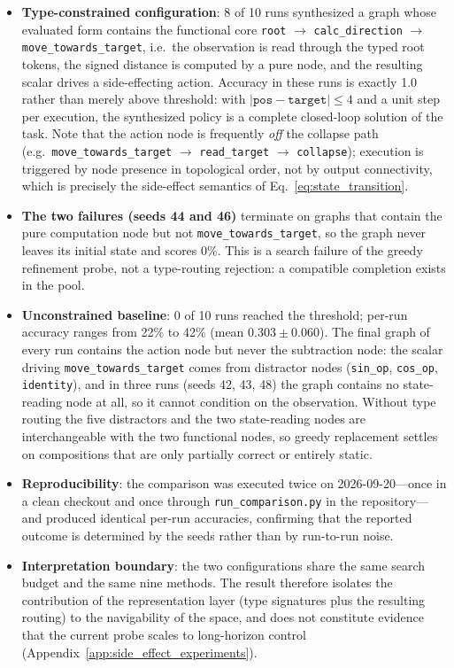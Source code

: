 \begin{itemize}
    \item \textbf{Type-constrained configuration}: 8 of 10 runs synthesized a graph whose evaluated form contains the functional core \texttt{root} $\rightarrow$ \texttt{calc\_direction} $\rightarrow$ \texttt{move\_towards\_target}, i.e.\ the observation is read through the typed root tokens, the signed distance is computed by a pure node, and the resulting scalar drives a side-effecting action. Accuracy in these runs is exactly 1.0 rather than merely above threshold: with $|\texttt{pos}-\texttt{target}| \leq 4$ and a unit step per execution, the synthesized policy is a complete closed-loop solution of the task. Note that the action node is frequently \emph{off} the collapse path (e.g.\ \texttt{move\_towards\_target} $\rightarrow$ \texttt{read\_target} $\rightarrow$ \texttt{collapse}); execution is triggered by node presence in topological order, not by output connectivity, which is precisely the side-effect semantics of Eq.~\ref{eq:state_transition}.
    \item \textbf{The two failures (seeds 44 and 46)} terminate on graphs that contain the pure computation node but not \texttt{move\_towards\_target}, so the graph never leaves its initial state and scores 0\%. This is a search failure of the greedy refinement probe, not a type-routing rejection: a compatible completion exists in the pool.
    \item \textbf{Unconstrained baseline}: 0 of 10 runs reached the threshold; per-run accuracy ranges from 22\% to 42\% (mean $0.303 \pm 0.060$). The final graph of every run contains the action node but never the subtraction node: the scalar driving \texttt{move\_towards\_target} comes from distractor nodes (\texttt{sin\_op}, \texttt{cos\_op}, \texttt{identity}), and in three runs (seeds 42, 43, 48) the graph contains no state-reading node at all, so it cannot condition on the observation. Without type routing the five distractors and the two state-reading nodes are interchangeable with the two functional nodes, so greedy replacement settles on compositions that are only partially correct or entirely static.
    \item \textbf{Reproducibility}: the comparison was executed twice on 2026-09-20---once in a clean checkout and once through \texttt{run\_comparison.py} in the repository---and produced identical per-run accuracies, confirming that the reported outcome is determined by the seeds rather than by run-to-run noise.
    \item \textbf{Interpretation boundary}: the two configurations share the same search budget and the same nine methods. The result therefore isolates the contribution of the representation layer (type signatures plus the resulting routing) to the navigability of the space, and does not constitute evidence that the current probe scales to long-horizon control (Appendix~\ref{app:side_effect_experiments}).
\end{itemize}

